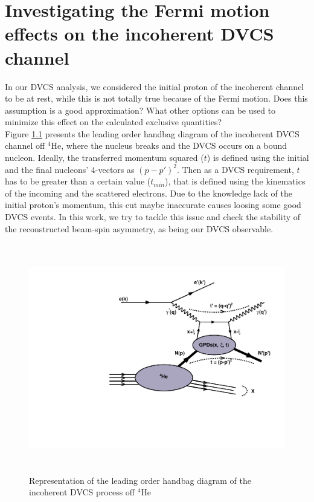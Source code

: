 \chapter{Investigating the Fermi motion effects on the incoherent DVCS channel}

In our DVCS analysis, we considered the initial proton of the incoherent 
channel to be at rest, while this is not totally true because of the Fermi 
motion. Does this assumption is a good approximation? What other options can be 
used to minimize this effect on the calculated exclusive quantities?\\

Figure \ref{fig:handbag} presents the leading order handbag diagram of the 
incoherent DVCS channel off $^4$He, where the nucleus breaks and the DVCS 
occurs on a bound nucleon. Ideally, the transferred momentum squared ($t$) is 
defined using the initial and the final nucleons' 4-vectors as $(p-p')^{2}$.  
Then as a DVCS requirement, $t$ has to be greater than a certain value 
($t_{min}$), that is defined using the kinematics of the incoming and the 
scattered electrons. Due to the knowledge lack of the initial proton's 
momentum, this cut maybe inaccurate causes loosing some good DVCS events. In 
this work, we try to tackle this issue and check the stability of the 
reconstructed beam-spin asymmetry, as being our DVCS observable.\\ 

\begin{figure}[h!]
   \centering
\includegraphics[height=10.0cm]{fig-incoh/handbag_incoherent.pdf}
\caption{Representation of the leading order handbag diagram of the incoherent 
DVCS process off $^4$He}
\label{fig:handbag}
\end{figure}

